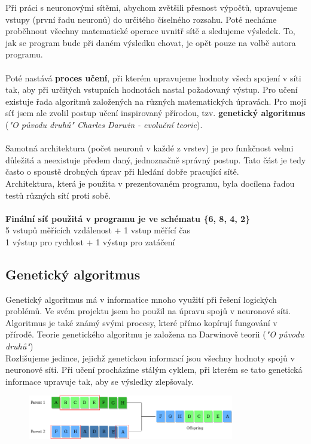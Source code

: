 \documentclass[a4paper,12pt]{article}
\newcommand{\tab}
{
    \hspace*{1em}
}
\begin{document}
        Při práci s neuronovými sítěmi, abychom zvětšili přesnost výpočtů, upravujeme vstupy
        (první řadu neuronů) do určitého číselného rozsahu. Poté necháme proběhnout všechny 
        matematické operace uvnitř sítě a sledujeme výsledek. To, jak se program bude při daném 
        výsledku chovat, je opět pouze na volbě autora programu.\\\\
        \tab Poté nastává \textbf{proces učení}, při kterém upravujeme hodnoty všech spojení v síti tak,
        aby při určitých vstupních hodnotách nastal požadovaný výstup. Pro učení existuje řada algoritmů
        založených na různých matematických úpravách. Pro moji síť jsem ale zvolil postup učení
        inspirovaný přírodou, tzv. \textbf{genetický algoritmus} (\textit{"O původu druhů" Charles Darwin - evoluční teorie}).\\\\
        \tab Samotná architektura (počet neuronů v každé z vrstev) je pro funkčnost velmi
        důležitá a neexistuje předem daný, jednoznačně správný postup. Tato část je tedy často o 
        spoustě drobných úprav při hledání dobře pracující sítě.\\
        \tab Architektura, která je použita v prezentovaném programu, byla docílena řadou testů
        různých sítí proti sobě.\\\\
        \textbf{Finální síť použitá v programu je ve schématu \{6, 8, 4, 2\}}\\
        5 vstupů měřících vzdálenost + 1 vstup měřící čas\\
        1 výstup pro rychlost + 1 výstup pro zatáčení

    \subsection{Genetický algoritmus}
        Genetický algoritmus má v informatice mnoho využití při řešení logických problémů. 
        Ve svém projektu jsem ho použil na úpravu spojů v neuronové síti. Algoritmus je také známý svými 
        procesy, které přímo kopírují fungování v přírodě. Teorie genetického algoritmu je založena 
        na Darwinově teorii (\textit{"O původu druhů"})\\
        \tab Rozlišujeme jedince, jejichž genetickou informací jsou všechny hodnoty spojů v neuronové síti. 
        Při učení procházíme stálým cyklem, při kterém se tato genetická informace upravuje tak, 
        aby se výsledky zlepšovaly.
        \vspace{0.5cm}
        \begin{figure}[H]
            \centering
            \includegraphics[width=0.8\textwidth]{data/genetic-algorithm.png}
            \label{fig:crossover}
        \end{figure}
\end{document}
